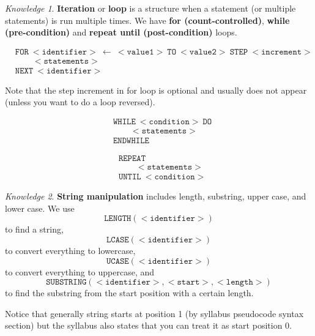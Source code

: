 \documentclass[8pt]{article}
\theoremstyle{remark}
\newtheorem{knowledge}{Knowledge}[subsection]
\begin{document}
            \begin{knowledge}
                \textbf{Iteration} or \textbf{loop} is a structure when a statement (or multiple statements) is run multiple times. We have \textbf{for (count-controlled)}, \textbf{while (pre-condition)} and \textbf{repeat until (post-condition)} loops.

                \begin{align*}
                    &\mathtt{FOR\ <identifier>\ \leftarrow\ <value1>\ TO\ <value2>\ STEP\ <increment>}\\
                    &\qquad \mathtt{<statements>}\\
                    &\mathtt{NEXT\ <identifier>}
                \end{align*}

                Note that the step increment in for loop is optional and usually does not appear (unless you want to do a loop reversed).

                \begin{align*}
                    &\mathtt{WHILE\ <condition>\ DO}\\
                    &\qquad \mathtt{<statements>}\\
                    &\mathtt{ENDWHILE}
                \end{align*}

                \begin{align*}
                    &\mathtt{REPEAT}\\
                    &\qquad \mathtt{<statements>}\\
                    &\mathtt{UNTIL\ <condition>}
                \end{align*}
            \end{knowledge}

            \begin{knowledge}
                \textbf{String manipulation} includes length, substring, upper case, and lower case. We use
                \[
                    \mathtt{LENGTH(<identifier>)}
                \]
                to find a string,
                \[
                    \mathtt{LCASE(<identifier>)}
                \]
                to convert everything to lowercase,
                \[
                    \mathtt{UCASE(<identifier>)}
                \]
                to convert everything to uppercase, and
                \[
                    \mathtt{SUBSTRING(<identifier>, <start>, <length>)}
                \]
                to find the substring from the start position with a certain length.

                Notice that generally string starts at position 1 (by syllabus pseudocode syntax section) but the syllabus also states that you can treat it as start position 0.
            \end{knowledge}
\end{document}
